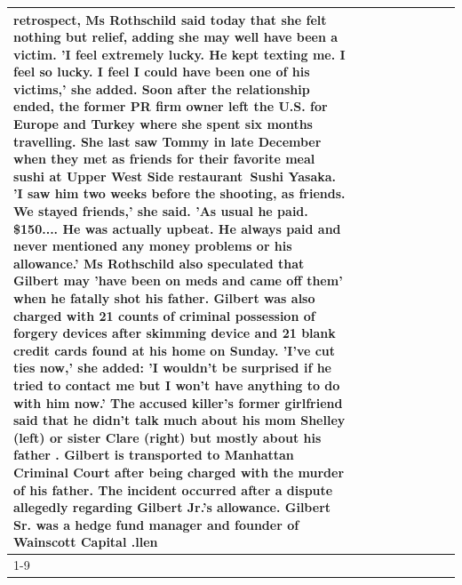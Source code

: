 \begin{table}[H]
\begin{tabular}{lllrlllll}
retrospect, Ms Rothschild said today that she felt nothing but relief, adding she may well have been a victim. 'I feel extremely lucky. He kept texting me. I feel so lucky. I feel I could have been one of his victims,' she added. Soon after the relationship ended, the former PR firm owner left the U.S. for Europe and Turkey where she spent six months  travelling. She last saw Tommy in late December when they met as friends for their favorite meal sushi at Upper West Side restaurant Sushi Yasaka. 'I saw him two weeks before the shooting, as friends. We stayed friends,' she said. 'As usual he paid. \$150.... He was actually upbeat. He always paid and never mentioned any money problems or his allowance.' Ms Rothschild also speculated that Gilbert may 'have been on meds and came off them' when he fatally shot his father. Gilbert was also charged with 21 counts of criminal possession of forgery devices after skimming device and 21 blank credit cards found at his home on Sunday. 'I've cut ties now,' she added: 'I wouldn’t be surprised if he tried to contact me but I won’t have anything to do with him now.' The accused killer's former girlfriend said that he didn't talk much about his mom Shelley (left) or sister Clare (right) but mostly about his father . Gilbert is transported to Manhattan Criminal Court  after being charged with the murder of his father. The incident occurred after a dispute allegedly regarding Gilbert Jr.'s allowance. Gilbert Sr. was a hedge fund manager and founder of Wainscott Capital .llen \\
\cline{1-9}

\end{tabular}
\end{table}
